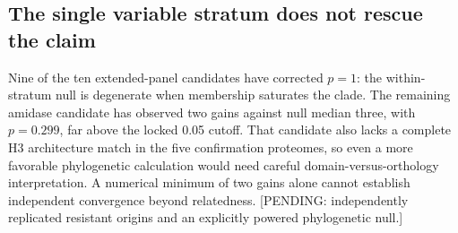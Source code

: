 \subsection{The single variable stratum does not rescue the claim}
Nine of the ten extended-panel candidates have corrected $p=1$: the within-stratum null is degenerate when membership saturates the clade. The remaining amidase candidate has observed two gains against null median three, with $p=0.299$, far above the locked 0.05 cutoff. That candidate also lacks a complete H3 architecture match in the five confirmation proteomes, so even a more favorable phylogenetic calculation would need careful domain-versus-orthology interpretation. A numerical minimum of two gains alone cannot establish independent convergence beyond relatedness. [PENDING: independently replicated resistant origins and an explicitly powered phylogenetic null.]
